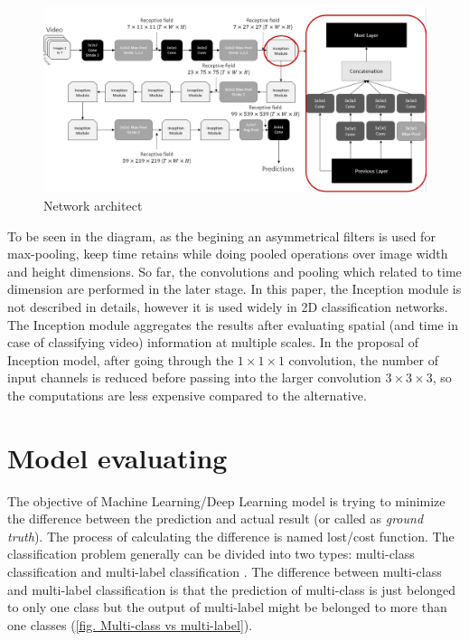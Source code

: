 \documentclass[a4paper, 12pt]{article}
\begin{document}
\begin{figure}[H]
    \centering
    \includegraphics[width=\textwidth]{Stream architecture.png}
    \caption{Network architect \citep{carreira2017quo}}
    \label{Fig: network architech I3d}
\end{figure}

To be seen in the diagram, as the begining an asymmetrical filters is used for max-pooling, keep time retains while doing pooled operations over image width and height dimensions. So far, the convolutions and pooling which related to time dimension are performed in the later stage. In this paper, the Inception module is not described in details, however it is used widely in 2D classification networks. The Inception module aggregates the results after evaluating spatial (and time in case of classifying video) information at multiple scales. In the proposal of Inception model, after going through the $1 \times 1 \times 1$ convolution, the number of input channels is reduced before passing into the larger convolution $3 \times 3 \times 3$, so the computations are less expensive compared to the alternative.

\section{Model evaluating}
The objective of Machine Learning/Deep Learning model is trying to minimize the difference between the prediction and actual result (or called as \textit{ground truth}). The process of calculating the difference is named lost/cost function. The classification problem generally can be divided into two types: multi-class classification and multi-label classification \citep{understandingLossFunction}. The difference between multi-class and multi-label classification is that the prediction of multi-class is just belonged to only one class but the output of multi-label might be belonged to more than one classes (\ref{fig. Multi-class vs multi-label}).
\end{document}
